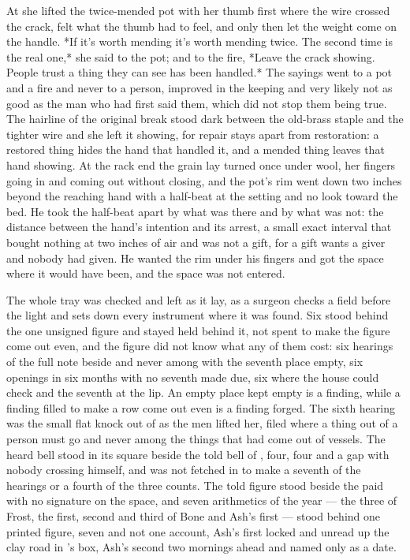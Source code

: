 At  she lifted the twice-mended pot with her thumb first where the wire crossed the crack, felt what the thumb had to feel, and only then let the weight come on the handle. *If it's worth mending it's worth mending twice. The second time is the real one,* she said to the pot; and to the fire, *Leave the crack showing. People trust a thing they can see has been handled.* The sayings went to a pot and a fire and never to a person, improved in the keeping and very likely not as good as the man who had first said them, which did not stop them being true. The hairline of the original break stood dark between the old-brass staple and the tighter wire and she left it showing, for repair stays apart from restoration: a restored thing hides the hand that handled it, and a mended thing leaves that hand showing. At the rack end the grain lay turned once under wool, her fingers going in and coming out without closing, and the pot's rim went down two inches beyond the reaching hand with a half-beat at the setting and no look toward the bed. He took the half-beat apart by what was there and by what was not: the distance between the hand's intention and its arrest, a small exact interval that bought nothing at two inches of air and was not a gift, for a gift wants a giver and nobody had given. He wanted the rim under his fingers and got the space where it would have been, and the space was not entered.

\scenebreak

The whole tray was checked and left as it lay, as a surgeon checks a field before the light and sets down every instrument where it was found. Six stood behind the one unsigned figure and stayed held behind it, not spent to make the figure come out even, and the figure did not know what any of them cost: six hearings of the full note beside and never among with the seventh place empty, six openings in six months with no seventh made due, six where the house could check and the seventh at the lip. An empty place kept empty is a finding, while a finding filled to make a row come out even is a finding forged. The sixth hearing was the small flat knock out of  as the men lifted her, filed where a thing out of a person must go and never among the things that had come out of vessels. The heard bell stood in its square beside the told bell of , four, four and a gap with nobody crossing himself, and was not fetched in to make a seventh of the hearings or a fourth of the three counts. The told figure stood beside the paid with no signature on the space, and seven arithmetics of the year --- the three of Frost, the first, second and third of Bone and Ash's first --- stood behind one printed figure, seven and not one account, Ash's first locked and unread up the clay road in 's box, Ash's second two mornings ahead and named only as a date.


